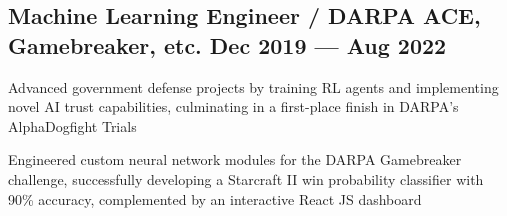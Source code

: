 \subsection{{Machine Learning Engineer / DARPA ACE, Gamebreaker, etc. \hfill Dec 2019 --- Aug 2022}}
\begin{zitemize}
	\item Advanced government defense projects by training RL agents and implementing novel AI trust capabilities, culminating in a first-place finish in DARPA's AlphaDogfight Trials
	\item Engineered custom neural network modules for the DARPA Gamebreaker challenge, successfully developing a Starcraft II win probability classifier with 90\% accuracy, complemented by an interactive React JS dashboard

\end{zitemize}



